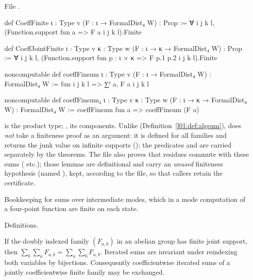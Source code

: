 \noindent File .
\begin{leancode}
def CoeffFinite {ι : Type v} (F : ι → FormalDist₄ W) : Prop :=
  ∀ i j k l, (Function.support fun a => F a i j k l).Finite

def CoeffJointFinite {ι : Type v} {κ : Type w} (F : ι → κ → FormalDist₄ W) : Prop :=
  ∀ i j k l, (Function.support fun p : ι × κ => F p.1 p.2 i j k l).Finite

noncomputable def coeffFinsum {ι : Type v} (F : ι → FormalDist₄ W) : FormalDist₄ W :=
  fun i j k l => ∑ᶠ a, F a i j k l

noncomputable def coeffFinsum₂ {ι : Type v} {κ : Type w} (F : ι → κ → FormalDist₄ W) :
    FormalDist₄ W := coeffFinsum fun a => coeffFinsum (F a)
\end{leancode}

\begin{dictionary}
 is the product type; ,  its components. Unlike 
(Definition~\ref{l01:def:algsum}),  does \emph{not} take a finiteness proof as an argument: it is
defined for all families and returns the junk value on infinite supports (); the predicates
 and  are carried separately by the theorems. The file also proves that residues
commute with these sums ( etc.); those lemmas are definitional and carry an \emph{unused}
finiteness hypothesis (named ), kept, according to the file, so that callers retain the certificate.
\end{dictionary}

\begin{physics}
Bookkeeping for sums over intermediate modes, which in a mode computation of a four-point function are finite on
each state.
\end{physics}

\begin{status}
Definitions.
\end{status}

\begin{theorem}\label{l01:thm:fubini}
If the doubly indexed family $(F_{a,b})$ in an abelian group has finite joint support, then
$\sum_b\sum_aF_{a,b} = \sum_a\sum_bF_{a,b}$. Iterated sums are invariant under reindexing both variables by
bijections. Consequently coefficientwise iterated sums of a jointly coefficientwise finite family may be exchanged.
\end{theorem}

